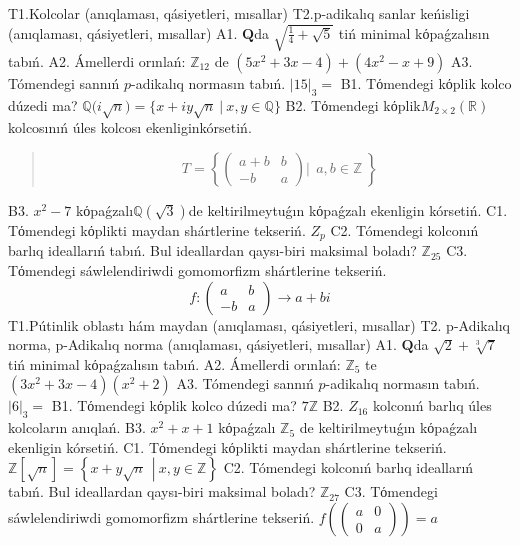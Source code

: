 T1.Kolcolar (anıqlaması, qásiyetleri, mısallar)
T2.p-adikalıq sanlar keńisligi (anıqlaması, qásiyetleri, mısallar)
A1. \(\mathbf{Q}\)da \(\sqrt{\frac{1}{4} + \sqrt{5}}\) tiń minimal kόpaǵzalısın tabıń.
A2. Ámellerdi orınlań: \(\mathbb{Z}_{12}\) de \(\left( 5x^{2} + 3x - 4 \right) + \left( 4x^{2} - x + 9 \right)\)
A3. Tómendegi sannıń \(p\)-adikalıq normasın tabıń. \(|15|_{3} =\)
B1. Tόmendegi kόplik kolco dúzedi ma? \(\mathbb{Q(}i\sqrt{n}) = \{ x + iy\sqrt{n}\ |\ x,y \in \mathbb{Q}\}\)
B2. Tόmendegi kόplik\(M_{2 \times 2}\left( \mathbb{R} \right)\)kolcosınıń úles kolcosı ekenliginkórsetiń.
\begin{quote}
\[T = \left\{ \begin{pmatrix}
a + b & b \\
 - b & a
\end{pmatrix}\left| \ \ a,b\mathbb{\in Z} \right.\  \right\}\]
\end{quote}
B3. \(x^{2} - 7\) kόpaǵzalı\(\mathbb{Q}(\sqrt{3})\)de keltirilmeytuǵın kόpaǵzalı ekenligin kórsetiń.
C1. Tόmendegi kόplikti maydan shártlerine tekseriń. \(Z_{p}\)
C2. Tómendegi kolconıń barlıq ideallarıń tabıń. Bul ideallardan qaysı-biri maksimal boladı? \(\mathbb{Z}_{25}\)
C3. Tόmendegi sáwlelendiriwdi gomomorfizm shártlerine tekseriń.
\[f:\begin{pmatrix}
a & b \\
 - b & a
\end{pmatrix} \rightarrow a + bi\]
T1.Pútinlik oblastı hám maydan (anıqlaması, qásiyetleri, mısallar)
T2. p-Adikalıq norma, p-Adikalıq norma (anıqlaması, qásiyetleri, mısallar)
A1. \(\mathbf{Q}\)da \(\sqrt{2} + \sqrt[3]{7}\)tiń minimal kόpaǵzalısın tabıń.
A2. Ámellerdi orınlań: \(\mathbb{Z}_{5}\) te \(\left( 3x^{2} + 3x - 4 \right)\left( x^{2} + 2 \right)\)
A3. Tómendegi sannıń \(p\)-adikalıq normasın tabıń. \(|6|_{3} =\)
B1. Tόmendegi kόplik kolco dúzedi ma? \(7\mathbb{Z}\)
B2. \(Z_{16}\) kolconıń barlıq úles kolcoların anıqlań.
B3. \(x^{2} + x + 1\) kόpaǵzalı \(\mathbb{Z}_{5}\) de keltirilmeytuǵın kόpaǵzalı ekenligin kórsetiń.
C1. Tόmendegi kόplikti maydan shártlerine tekseriń. \(\mathbb{Z}\left\lbrack \sqrt{n} \right\rbrack = \left\{ x + y\sqrt{n}\ \ \left| \right.\ x,y \in \mathbb{Z} \right\}\)
C2. Tómendegi kolconıń barlıq ideallarıń tabıń. Bul ideallardan qaysı-biri maksimal boladı? \(\mathbb{Z}_{27}\)
C3. Tόmendegi sáwlelendiriwdi gomomorfizm shártlerine tekseriń. \(f\left( \begin{pmatrix}
a & 0 \\
0 & a
\end{pmatrix} \right) = a\)
